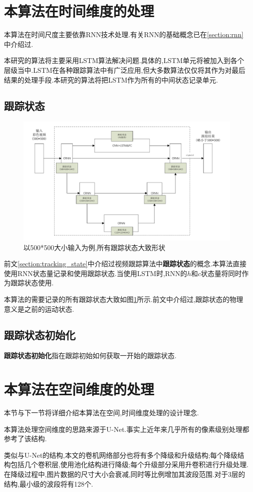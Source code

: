 \section{本算法在时间维度的处理}
\par
本算法在时间尺度主要依靠RNN技术处理.有关RNN的基础概念已在\ref{section:rnn}中介绍过.
\par
本研究的算法将主要采用LSTM算法解决问题.具体的,LSTM单元将被加入到各个层级当中.LSTM在各种跟踪算法中有广泛应用,但大多数算法仅仅将其作为对最后结果的处理手段.本研究的算法将把LSTM作为所有的中间状态记录单元.

\subsection{跟踪状态}
\par
\begin{figure}
    \centering
    \includegraphics[width = 1.\textwidth]{chap/img/tracking_state.pdf}
    \caption{以500*500大小输入为例,所有跟踪状态大致形状}
    \label{fig:tracking_state}
\end{figure}
\par
前文\ref{section:tracking_state}中介绍过视频跟踪算法中\textbf{跟踪状态}的概念.本算法直接使用RNN状态量记录和使用跟踪状态.当使用LSTM时,RNN的$h$和$c$状态量将同时作为跟踪状态使用.
\par
本算法的需要记录的所有跟踪状态大致如图\ref{fig:tracking_state}所示.前文中介绍过,跟踪状态的物理意义是之前的运动状态.%
\subsection{跟踪状态初始化}
\textbf{跟踪状态初始化}指在跟踪初始如何获取一开始的跟踪状态.

\section{本算法在空间维度的处理}
本节与下一节将详细介绍本算法在空间,时间维度处理的设计理念.
\par
本算法处理空间维度的思路来源于U-Net\supercite{ronneberger2015u}.事实上近年来几乎所有的像素级别处理都参考了该结构.
\par
类似与U-Net的结构,本文的卷机网络部分也将有多个降级和升级结构;每个降级结构包括几个卷积层,使用池化结构进行降级;每个升级部分采用升卷积进行升级处理.在降级过程中,图片数据的尺寸大小会衰减,同时等比例增加其波段范围.对于3层的结构,最小级的波段将有128个.

